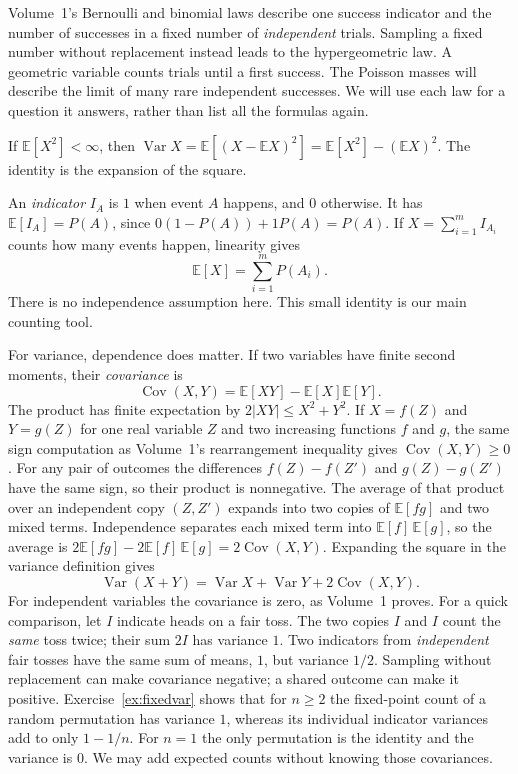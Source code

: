 Volume~1's Bernoulli and binomial laws describe one success indicator and the number of successes in a fixed number of \emph{independent} trials. Sampling a fixed number without replacement instead leads to the hypergeometric law. A geometric variable counts trials until a first success. The Poisson masses will describe the limit of many rare independent successes. We will use each law for a question it answers, rather than list all the formulas again.

\begin{definitionx}[variance]
If $\mathbb E[X^2]<\infty$, then $\operatorname{Var}X=\mathbb E[(X-\mathbb EX)^2]=\mathbb E[X^2]-(\mathbb EX)^2$. The identity is the expansion of the square.
\end{definitionx}

An \emph{indicator} $I_A$ is $1$ when event $A$ happens, and $0$ otherwise. It has $\mathbb E[I_A]=P(A)$, since $0(1-P(A))+1P(A)=P(A)$. If $X=\sum_{i=1}^m I_{A_i}$ counts how many events happen, linearity gives
\[
 \mathbb E[X]=\sum_{i=1}^mP(A_i).
\]
There is no independence assumption here. This small identity is our main counting tool.

For variance, dependence does matter. If two variables have finite second moments, their \emph{covariance} is
\[
 \operatorname{Cov}(X,Y)=\mathbb E[XY]-\mathbb E[X]\mathbb E[Y].
\]
The product has finite expectation by $2|XY|\le X^2+Y^2$. If $X=f(Z)$ and $Y=g(Z)$ for one real variable $Z$ and two increasing functions $f$ and $g$, the same sign computation as Volume~1's rearrangement inequality gives $\operatorname{Cov}(X,Y)\ge0$. For any pair of outcomes the differences $f(Z)-f(Z')$ and $g(Z)-g(Z')$ have the same sign, so their product is nonnegative. The average of that product over an independent copy $(Z,Z')$ expands into two copies of $\mathbb E[fg]$ and two mixed terms. Independence separates each mixed term into $\mathbb E[f]\,\mathbb E[g]$, so the average is $2\mathbb E[fg]-2\mathbb E[f]\,\mathbb E[g]=2\operatorname{Cov}(X,Y)$. Expanding the square in the variance definition gives
\[
 \operatorname{Var}(X+Y)=\operatorname{Var}X+\operatorname{Var}Y
                      +2\operatorname{Cov}(X,Y).
\]
For independent variables the covariance is zero, as Volume~1 proves. For a quick comparison, let $I$ indicate heads on a fair toss. The two copies $I$ and $I$ count the \emph{same} toss twice; their sum $2I$ has variance $1$. Two indicators from \emph{independent} fair tosses have the same sum of means, $1$, but variance $1/2$. Sampling without replacement can make covariance negative; a shared outcome can make it positive. Exercise~\ref{ex:fixedvar} shows that for $n\ge2$ the fixed-point count of a random permutation has variance $1$, whereas its individual indicator variances add to only $1-1/n$. For $n=1$ the only permutation is the identity and the variance is $0$. We may add expected counts without knowing those covariances.

